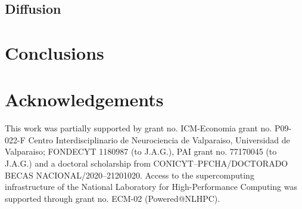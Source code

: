 \documentclass[twoside,twocolumn,9pt]{article}
\begin{document}
\subsection{Diffusion}

\section{Conclusions}


\section*{Acknowledgements}
This work was partially supported by grant no. ICM-Economia grant no. P09-022-F Centro Interdisciplinario de Neurociencia de Valparaiso, Universidad de Valparaiso; FONDECYT 1180987 (to J.A.G.), PAI grant no. 77170045 (to J.A.G.) and a doctoral scholarship from CONICYT--PFCHA/DOCTORADO BECAS NACIONAL/2020--21201020. Access to the supercomputing infrastructure of the National Laboratory for High-Performance Computing was supported through grant no. ECM-02 (Powered@NLHPC).




\end{document}

